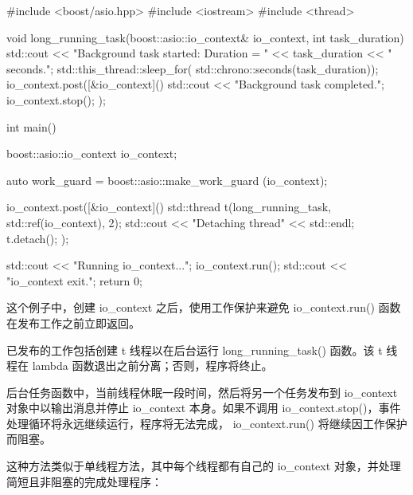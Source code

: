 \begin{cpp}
#include <boost/asio.hpp>
#include <iostream>
#include <thread>

void long_running_task(boost::asio::io_context& io_context,
                       int task_duration) {
    std::cout << "Background task started: Duration = "
              << task_duration << " seconds.\n";
    std::this_thread::sleep_for(
                      std::chrono::seconds(task_duration));
    io_context.post([&io_context]() {
        std::cout << "Background task completed.\n";
        io_context.stop();
    });
}

int main() {
    boost::asio::io_context io_context;

    auto work_guard = boost::asio::make_work_guard
                                            (io_context);

    io_context.post([&io_context]() {
        std::thread t(long_running_task,
                      std::ref(io_context), 2);
        std::cout << "Detaching thread" << std::endl;
        t.detach();
    });

    std::cout << "Running io_context...\n";
    io_context.run();
    std::cout << "io_context exit.\n";
    return 0;
}
\end{cpp}

这个例子中，创建 io\_context 之后，使用工作保护来避免 io\_context.run() 函数在发布工作之前立即返回。

已发布的工作包括创建 t 线程以在后台运行 long\_running\_task() 函数。该 t 线程在 lambda 函数退出之前分离；否则，程序将终止。

后台任务函数中，当前线程休眠一段时间，然后将另一个任务发布到 io\_context 对象中以输出消息并停止 io\_context 本身。如果不调用 io\_context.stop()，事件处理循环将永远继续运行，程序将无法完成， io\_context.run() 将继续因工作保护而阻塞。


这种方法类似于单线程方法，其中每个线程都有自己的 io\_context 对象，并处理简短且非阻塞的完成处理程序：


